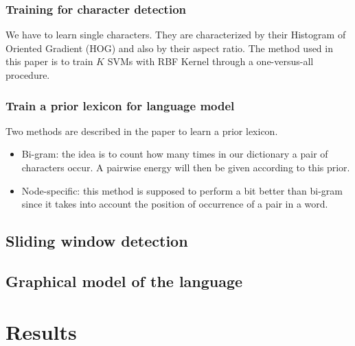 \documentclass[10pt,a4paper]{article}
\begin{document}
\subsubsection{Training for character detection}

We have to learn single characters. They are characterized by their Histogram of Oriented Gradient (HOG) and also by their aspect ratio. The method used in this paper is to train $K$ SVMs with RBF Kernel through a one-versus-all procedure. 


\subsubsection{Train a prior lexicon for language model}

Two methods are described in the paper to learn a prior lexicon. 

\begin{itemize}
	\item Bi-gram: the idea is to count how many times in our dictionary a pair of characters occur. A pairwise energy will then be given according to this prior.
	\item Node-specific: this method is supposed to perform a bit better than bi-gram since it takes into account the position of occurrence of a pair in a word.
\end{itemize}



\subsection{Sliding window detection}




\subsection{Graphical model of the language}





\section{Results}







\newpage



\end{document}
